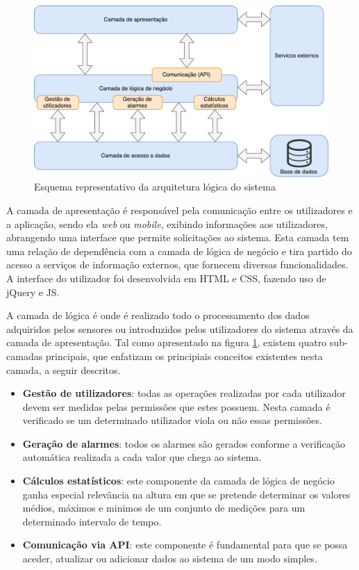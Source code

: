 \begin{figure}[!htb]
	\centering
	\includegraphics[scale = 0.6]{esquemas/arquitetura-logica.pdf}
	\caption{Esquema representativo da arquitetura lógica do sistema }
	\label{logicaarqu}
\end{figure}



A camada de apresentação é responsável pela comunicação entre os utilizadores e a aplicação, sendo ela \textit{web} ou \textit{mobile}, exibindo informações aos utilizadores, abrangendo uma interface que permite solicitações ao sistema. Esta camada tem uma relação de dependência com a camada de lógica de negócio e tira partido do acesso a serviços de informação externos, que fornecem diversas funcionalidades. A interface do utilizador foi desenvolvida em  \ac{HTML} e \acs{CSS}, fazendo uso de jQuery e \ac{JS}.





A camada de lógica é onde é realizado todo o processamento dos dados adquiridos pelos sensores ou introduzidos pelos utilizadores do sistema através da camada de apresentação.  Tal como apresentado na figura \ref{logicaarqu}, existem quatro sub-camadas principais, que enfatizam os principiais conceitos existentes nesta camada, a seguir descritos.  


\begin{itemize}
	\item \textbf{Gestão de utilizadores}: todas as operações realizadas por cada utilizador devem ser medidas pelas permissões que estes possuem. Nesta camada é verificado se um determinado utilizador viola ou não essas permissões. 
	
	\item \textbf{Geração de alarmes}: todos os alarmes são gerados conforme a verificação automática realizada a cada valor que chega ao sistema. 
	\item \textbf{Cálculos estatísticos}: este componente da camada de lógica de negócio ganha especial relevância na altura em que se pretende determinar os valores médios, máximos e minimos de um conjunto de medições para um determinado intervalo de tempo. 
	\item \textbf{Comunicação via \ac{API}}: este componente é fundamental para que se possa aceder, atualizar ou adicionar dados ao sistema de um modo simples.
\end{itemize}



